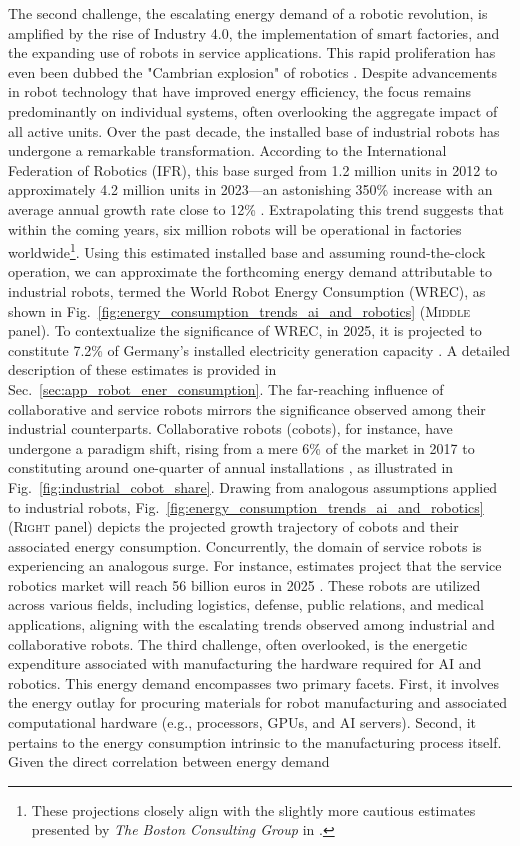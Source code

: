 \documentclass[12pt]{article}
\begin{document}
The second challenge, the escalating energy demand of a robotic revolution, is amplified by the rise of Industry 4.0, the implementation of smart factories, and the expanding use of robots in service applications. This rapid proliferation has even been dubbed the "Cambrian explosion" of robotics \cite{Pratt2015Iscambrianexplosion}. Despite advancements in robot technology that have improved energy efficiency, the focus remains predominantly on individual systems, often overlooking the aggregate impact of all active units. Over the past decade, the installed base of industrial robots has undergone a remarkable transformation. According to the International Federation of Robotics (IFR), this base surged from 1.2 million units in 2012 to approximately 4.2 million units in 2023—an astonishing 350\% increase with an average annual growth rate close to 12\% \cite{IFR2024WorldRobotics2024}. Extrapolating this trend suggests that within the coming years, six million robots will be operational in factories worldwide\footnote{These projections closely align with the slightly more cautious estimates presented by \textit{The Boston Consulting Group} in \cite{Sirkin2015HowRobotsWill}.}. Using this estimated installed base and assuming round-the-clock operation, we can approximate the forthcoming energy demand attributable to industrial robots, termed the World Robot Energy Consumption (WREC), as shown in Fig.~\ref{fig:energy_consumption_trends_ai_and_robotics} (\textsc{Middle} panel). To contextualize the significance of WREC, in 2025, it is projected to constitute 7.2\% of Germany's installed electricity generation capacity \cite{FraunhoferISENetinstalledelectricity}. A detailed description of these estimates is provided in Sec.~\ref{sec:app_robot_ener_consumption}. The far-reaching influence of collaborative and service robots mirrors the significance observed among their industrial counterparts. Collaborative robots (cobots), for instance, have undergone a paradigm shift, rising from a mere 6\% of the market in 2017 to constituting around one-quarter of annual installations \cite{tobe2015}, as illustrated in Fig.~\ref{fig:industrial_cobot_share}. Drawing from analogous assumptions applied to industrial robots, Fig.~\ref{fig:energy_consumption_trends_ai_and_robotics} (\textsc{Right} panel) depicts the projected growth trajectory of cobots and their associated energy consumption. Concurrently, the domain of service robots is experiencing an analogous surge. For instance, estimates project that the service robotics market will reach 56 billion euros in 2025 \cite{statista_service_robots}. These robots are utilized across various fields, including logistics, defense, public relations, and medical applications, aligning with the escalating trends observed among industrial and collaborative robots. The third challenge, often overlooked, is the energetic expenditure associated with manufacturing the hardware required for AI and robotics. This energy demand encompasses two primary facets. First, it involves the energy outlay for procuring materials for robot manufacturing and associated computational hardware (e.g., processors, GPUs, and AI servers). Second, it pertains to the energy consumption intrinsic to the manufacturing process itself. Given the direct correlation between energy demand 
\end{document}
